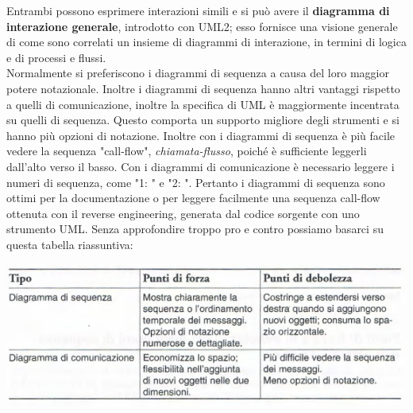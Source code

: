 \documentclass[a4paper,12pt, oneside]{book}
\begin{document}
Entrambi possono esprimere interazioni simili e si può avere il \textbf{diagramma di interazione generale}, introdotto con UML2; esso fornisce una visione generale di come sono correlati un insieme di diagrammi di interazione, in termini
di logica e di processi e flussi.\\
Normalmente si preferiscono i diagrammi di sequenza a causa del loro maggior potere notazionale. Inoltre i diagrammi di sequenza hanno altri vantaggi rispetto a quelli di comunicazione, inoltre la specifica di UML è maggiormente incentrata su quelli di sequenza. Questo comporta un supporto migliore degli strumenti e si hanno più opzioni di notazione. Inoltre con i diagrammi di sequenza è più facile vedere la sequenza "call-flow", \textit{chiamata-flusso}, poiché è sufficiente leggerli dall'alto verso il basso. Con i diagrammi di comunicazione è necessario leggere i numeri di sequenza, come "1: " e "2: ". Pertanto i diagrammi di sequenza sono ottimi per la documentazione o per leggere facilmente una sequenza call-flow ottenuta con il reverse engineering, generata dal codice sorgente con uno strumento UML.
\newpage
Senza approfondire troppo pro e contro possiamo basarci su questa tabella riassuntiva:
\begin{center}
	\includegraphics[scale=0.7]{img/pc.png}
\end{center}
\end{document}
